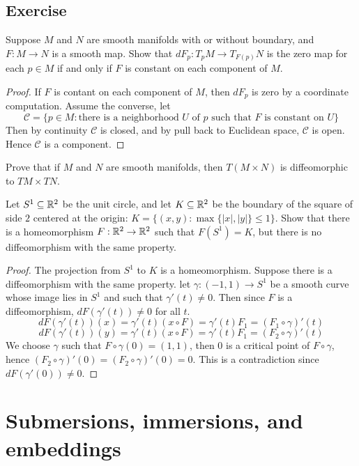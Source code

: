 \section{Exercise}
\begin{exercise}
Suppose $M$ and $N$ are smooth manifolds with or without boundary, and $F:M\to N$ is a smooth map. Show that $dF_p:T_pM\to T_{F(p)}N$ is the zero map for each $p\in M$ if and only if $F$ is constant on each component of $M$.
\end{exercise}
\begin{proof}
If $F$ is contant on each component of $M$, then $dF_p$ is zero by a coordinate computation. Assume the converse, let
\[\mathscr{C}=\{p\in M:\text{there is a neighborhood $U$ of $p$ such that $F$ is constant on $U$}\}\]
Then by continuity $\mathscr{C}$ is closed, and by pull back to Euclidean space, $\mathscr{C}$ is open. Hence $\mathscr{C}$ is a component.
\end{proof}
\begin{exercise}
Prove that if $M$ and $N$ are smooth manifolds, then $T(M\times N)$ is diffeomorphic
to $TM\times TN$.
\end{exercise}
\begin{exercise}
Let $S^1\subseteq\mathbb{R}^2$ be the unit circle, and let $K\subseteq\mathbb{R}^2$ be the boundary of the square of side $2$ centered at the origin: $K=\{(x,y):\max\{|x|,|y|\}\leq 1\}$. Show that there is a homeomorphism $F:\mathbb{R}^2\to\mathbb{R}^2$ such that $F(S^1)=K$, but there is
no diffeomorphism with the same property.
\end{exercise}
\begin{proof}
The projection from $S^1$ to $K$ is a homeomorphism. Suppose there is a diffeomorphism with the same property. let $\gamma:(-1,1)\to S^1$ be a smooth curve whose image lies in $S^1$ and such that $\gamma'(t)\neq 0$. Then since $F$ is a diffeomorphism, $dF(\gamma'(t))\neq 0$ for all $t$.
\[dF(\gamma'(t))(x)=\gamma'(t)(x\circ F)=\gamma'(t)F_1=(F_1\circ\gamma)'(t)\]
\[dF(\gamma'(t))(y)=\gamma'(t)(x\circ F)=\gamma'(t)F_1=(F_2\circ\gamma)'(t)\]
We choose $\gamma$ such that $F\circ\gamma(0)=(1,1)$, then $0$ is a critical point of $F\circ\gamma$, hence $(F_2\circ\gamma)'(0)=(F_2\circ\gamma)'(0)=0$. This is a contradiction since $dF(\gamma'(0))\neq 0$.
\end{proof}
\chapter{Submersions, immersions, and embeddings}
